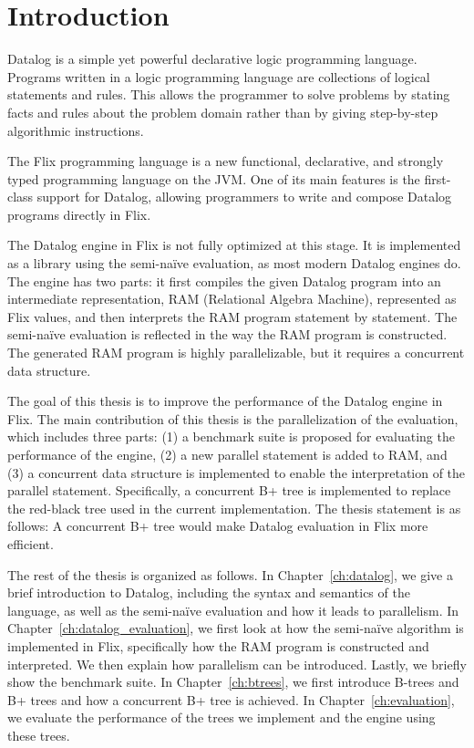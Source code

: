 \documentclass[11pt]{report}
\theoremstyle{definition}
\begin{document}
\chapter{Introduction}
\label{ch:intro}

Datalog is a simple yet powerful declarative logic programming language. Programs written in a logic programming language are collections of logical statements and rules. This allows the programmer to solve problems by stating facts and rules about the problem domain rather than by giving step-by-step algorithmic instructions.

The Flix programming language is a new functional, declarative, and strongly typed programming language on the JVM. One of its main features is the first-class support for Datalog, allowing programmers to write and compose Datalog programs directly in Flix.

The Datalog engine in Flix is not fully optimized at this stage. It is implemented as a library using the semi-naïve evaluation, as most modern Datalog engines do. The engine has two parts: it first compiles the given Datalog program into an intermediate representation, RAM (Relational Algebra Machine), represented as Flix values, and then interprets the RAM program statement by statement. The semi-naïve evaluation is reflected in the way the RAM program is constructed. The generated RAM program is highly parallelizable, but it requires a concurrent data structure.

The goal of this thesis is to improve the performance of the Datalog engine in Flix. The main contribution of this thesis is the parallelization of the evaluation, which includes three parts: (1) a benchmark suite is proposed for evaluating the performance of the engine, (2) a new parallel statement is added to RAM, and (3) a concurrent data structure is implemented to enable the interpretation of the parallel statement. Specifically, a concurrent B+ tree is implemented to replace the red-black tree used in the current implementation. The thesis statement is as follows: A concurrent B+ tree would make Datalog evaluation in Flix more efficient.

The rest of the thesis is organized as follows. In Chapter~\ref{ch:datalog}, we give a brief introduction to Datalog, including the syntax and semantics of the language, as well as the semi-naïve evaluation and how it leads to parallelism. In Chapter~\ref{ch:datalog_evaluation}, we first look at how the semi-naïve algorithm is implemented in Flix, specifically how the RAM program is constructed and interpreted. We then explain how parallelism can be introduced. Lastly, we briefly show the benchmark suite. In Chapter~\ref{ch:btrees}, we first introduce B-trees and B+ trees and how a concurrent B+ tree is achieved. In Chapter~\ref{ch:evaluation}, we evaluate the performance of the trees we implement and the engine using these trees.
\end{document}

